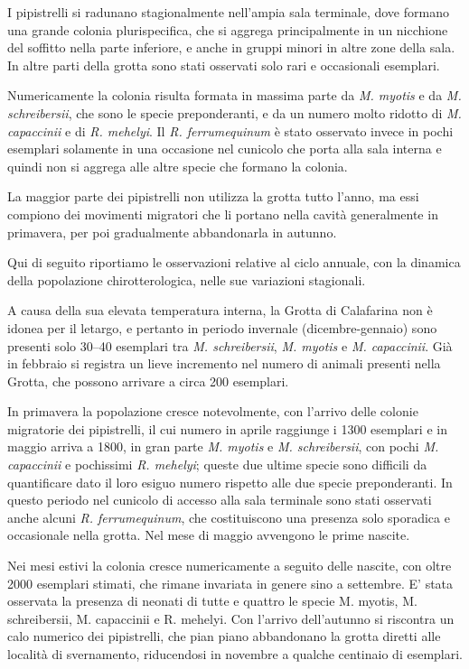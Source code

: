 \begin{multicols}{2}
I pipistrelli si radunano stagionalmente nell’ampia sala terminale, dove formano una grande colonia plurispecifica, che si aggrega principalmente in un nicchione del soffitto nella parte inferiore, e anche in gruppi minori in altre zone della sala. In altre parti della grotta sono stati osservati solo rari e occasionali esemplari. 

Numericamente la colonia risulta formata in massima parte da \emph{M. myotis} e da \emph{M. schreibersii}, che sono le specie preponderanti, e da un numero molto ridotto di \emph{M. capaccinii} e di \emph{R. mehelyi}. Il \emph{R. ferrumequinum} è stato osservato invece in pochi esemplari solamente in una occasione nel cunicolo che porta alla sala interna e quindi non si aggrega alle altre specie che formano la colonia.

La maggior parte dei pipistrelli non utilizza la grotta tutto l’anno, ma essi compiono dei movimenti migratori che li portano nella cavità generalmente in primavera, per poi gradualmente abbandonarla in autunno.

Qui di seguito riportiamo le osservazioni relative al ciclo annuale, con la dinamica della popolazione chirotterologica, nelle sue variazioni stagionali.

A causa della sua elevata temperatura interna, la Grotta di Calafarina non è idonea per il letargo, e pertanto in periodo invernale (dicembre-gennaio) sono presenti solo 30--40 esemplari tra \emph{M. schreibersii}, \emph{M. myotis} e \emph{M. capaccinii}. Già in febbraio si registra un lieve incremento nel numero di animali presenti nella Grotta, che possono arrivare a circa 200 esemplari.

In primavera la popolazione cresce notevolmente, con l’arrivo delle colonie migratorie dei pipistrelli, il cui numero in aprile raggiunge i 1300 esemplari e in maggio arriva a 1800, in gran parte \emph{M. myotis} e \emph{M. schreibersii}, con pochi \emph{M. capaccinii} e pochissimi \emph{R. mehelyi}; queste due ultime specie sono difficili da quantificare dato il loro esiguo numero rispetto alle due specie preponderanti. In questo periodo nel cunicolo di accesso alla sala terminale sono stati osservati anche alcuni \emph{R. ferrumequinum}, che costituiscono una presenza solo sporadica e occasionale nella grotta. Nel mese di maggio avvengono le prime nascite.

Nei mesi estivi la colonia cresce numericamente a seguito delle nascite, con oltre 2000 esemplari stimati, che rimane invariata in genere sino a settembre. E’ stata osservata la presenza di neonati di tutte e quattro le specie M. myotis, M. schreibersii, M. capaccinii e R. mehelyi.
Con l’arrivo dell’autunno si riscontra un calo numerico dei pipistrelli, che pian piano abbandonano la grotta diretti alle località di svernamento, riducendosi in novembre a qualche centinaio di esemplari. 


\end{multicols}
